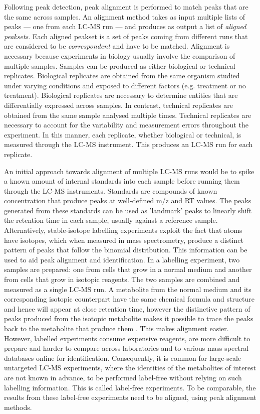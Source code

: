 Following peak detection, peak alignment is performed to match peaks that are the same across samples. An alignment method takes as input multiple lists of peaks --- one from each LC-MS run --- and produces as output a list of \emph{aligned peaksets}. Each aligned peakset is a set of peaks coming from different runs that are considered to be \emph{correspondent} and have to be matched. Alignment is necessary because experiments in biology usually involve the comparison of multiple samples. Samples can be produced as either biological or technical replicates. Biological replicates are obtained from the same organism studied under varying conditions and exposed to different factors (e.g. treatment or no treatment). Biological replicates are necessary to determine entities that are differentially expressed across samples. In contrast, technical replicates are obtained from the same sample analysed multiple times. Technical replicates are necessary to account for the variability and measurement errors throughout the experiment. In this manner, each replicate, whether biological or technical, is measured through the LC-MS instrument. This produces an LC-MS run for each replicate.

An initial approach towards alignment of multiple LC-MS runs  would be to spike a known amount of internal standards into each sample before running them through the LC-MS instruments. Standards are compounds of known concentration that produce peaks at well-defined m/z and RT values. The peaks generated from these standards can be used as 'landmark' peaks to linearly shift the retention time in each sample, usually against a reference sample. Alternatively, stable-isotope labelling experiments exploit the fact that atoms have isotopes, which when measured in mass spectrometry, produce a distinct pattern of peaks that follow the binomial distribution. This information can be used to aid peak alignment and identification. In a labelling experiment, two samples are prepared: one from cells that grow in a normal medium and another from cells that grow in isotopic reagents. The two samples are combined and measured as a single LC-MS run. A metabolite from the normal medium and its corresponding isotopic counterpart have the same chemical formula and structure and hence will appear at close retention time, however the distinctive pattern of peaks produced from the isotopic metabolite makes it possible to trace the peaks back to the metabolite that produce them \cite{chokkathukalam2014stable}. This makes alignment easier. However, labelled experiments consume expensive reagents, are more difficult to prepare and harder to compare across laboratories and to various mass spectral databases online for identification. Consequently, it is common for large-scale untargeted LC-MS experiments, where the identities of the metabolites of interest are not known in advance, to be performed label-free without relying on such labelling information. This is called label-free experiments. To be comparable, the results from these label-free experiments need to be aligned, using peak alignment methods.

